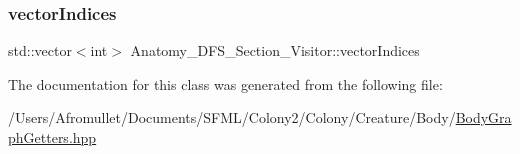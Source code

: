 \subsubsection{\texorpdfstring{vector\+Indices}{vectorIndices}}
{\footnotesize\ttfamily std\+::vector$<$int$>$ Anatomy\+\_\+\+D\+F\+S\+\_\+\+Section\+\_\+\+Visitor\+::vector\+Indices\hspace{0.3cm}{\ttfamily [private]}}



The documentation for this class was generated from the following file\+:\begin{DoxyCompactItemize}
\item 
/\+Users/\+Afromullet/\+Documents/\+S\+F\+M\+L/\+Colony2/\+Colony/\+Creature/\+Body/\mbox{\hyperlink{_body_graph_getters_8hpp}{Body\+Graph\+Getters.\+hpp}}\end{DoxyCompactItemize}
